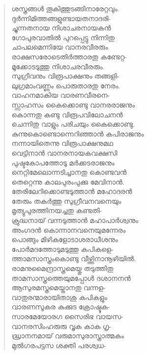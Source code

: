 \begin{verse}
ശസ്ത്രങ്ങള്‍ തൂകിത്തുടങ്ങിനാരേറ്റവും.\\
ദുര്‍ന്നിമിത്തങ്ങളുണ്ടായതനാദരി-\\
ച്ചുന്നതനായ നിശാചരനായകന്‍\\
ഗോപുരവാതില്‍ പുറപ്പെട്ടു നിന്നിതു\\
ചാപലമെന്നിയേ വാനരവീരരും\\
രാക്ഷസരോടെതിര്‍ത്താരതു കണ്ടേറ്റ-\\
മൂക്കോടടുത്തു നിശാചരവീരരും.\\
സുഗ്രീവനും വിരൂപാക്ഷനും തങ്ങളി-\\
ലുഗ്രമാംവണ്ണം പൊരുതാരതു നേരം.\\
വാഹനമാകിയ വാരണവീരനെ-\\
സ്സാഹസം കൈക്കൊണ്ടു വാനരരാജനും\\
കൊന്നതു കണ്ടു വിരൂപവിലോചനന്‍\\
ചെന്നിതു വാളും പരിചയും കൈക്കൊണ്ടു.\\
കുന്നുകൊണ്ടൊന്നെറിഞ്ഞാന്‍ കപിരാജനും\\
നന്നായിതെന്നു വിരൂപാക്ഷനുമഥ\\
വെട്ടിനാന്‍ വാനരനായകവക്ഷസി\\
പുഷ്ടകോപത്തോടു മര്‍ക്കടരാജനും\\
നെറ്റിമേലൊന്നടിച്ചാനതു കൊണ്ടവന്‍\\
തെറ്റെന്നു കാലപുരംപുക്കു മേവിനാന്‍.\\
തേരിലേറിക്കൊണ്ടടുത്താന്‍ മഹോദരന്‍\\
തേരും തകര്‍ത്തു സുഗ്രീവനവനെയും\\
മൃത്യുപുരത്തിനയച്ചതു കണ്ടതി-\\
ക്രുദ്ധനായ് വന്നടുത്താന്‍ മഹാപാര്‍ശ്വനും\\
അംഗദന്‍ കൊന്നാനവനെയുമന്നേരം\\
പൊങ്ങും മിഴികളോടാശരാധീശനും\\
പോര്‍മദത്തോടുമടുത്തു കപികളെ-\\
ത്താമസാസ്ത്രംകൊണ്ടു വീഴ്ത്തിനാനൂഴിയില്‍.\\
രാമനുമൈന്ദ്രാസ്ത്രമെയ്തു തടുത്തിതു\\
താമസാസ്ത്രത്തെയുമപ്പോള്‍ ദശാനനന്‍\\
ആസുരമസ്ത്രമെയ്താനതു വന്നള-\\
വാതുരന്മാരായിതാശു കപികളും\\
വാരണസൂകര കുക്കുട ക്രോഷ്ടുക-\\
സാരമേയോരഗ സൈരിഭ വായസ-\\
വാനരസിംഹരുരു വൃക കാക ഗൃ-\\
ദ്ധ്രാനനമായ് വരുമാസുരാസ്ത്രാത്മകം\\
മുല്‍ഗരപട്ടസ ശക്തി പരശ്വധ-\\

\end{verse}
